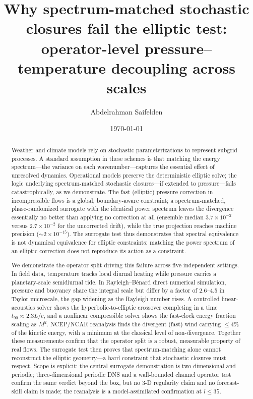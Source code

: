 \documentclass[aps,prfluids,preprint,superscriptaddress,nofootinbib]{revtex4-2}
\begin{document}
\title{Why spectrum-matched stochastic closures fail the elliptic test: operator-level pressure--temperature decoupling across scales}

\author{Abdelrahman Saifelden}

\date{\today}

\begin{abstract}
Weather and climate models rely on stochastic parameterizations to represent subgrid processes. A standard assumption in these schemes is that matching the energy spectrum---the variance on each wavenumber---captures the essential effect of unresolved dynamics. Operational models preserve the deterministic elliptic solve; the logic underlying spectrum-matched stochastic closures---if extended to pressure---fails catastrophically, as we demonstrate. The fast (elliptic) pressure correction in incompressible flows is a global, boundary-aware constraint; a spectrum-matched, phase-randomized surrogate with the identical power spectrum leaves the divergence essentially no better than applying no correction at all (ensemble median $3.7\times10^{-2}$ versus $2.7\times10^{-2}$ for the uncorrected drift), while the true projection reaches machine precision ($\sim2\times10^{-15}$). The surrogate test thus demonstrates that spectral equivalence is not dynamical equivalence for elliptic constraints: matching the power spectrum of an elliptic correction does not reproduce its action as a constraint.

We demonstrate the operator split driving this failure across five independent settings. In field data, temperature tracks local diurnal heating while pressure carries a planetary-scale semidiurnal tide. In Rayleigh--B\'enard direct numerical simulation, pressure and buoyancy share the integral scale but differ by a factor of 2.6--4.5 in Taylor microscale, the gap widening as the Rayleigh number rises. A controlled linear-acoustics solver shows the hyperbolic-to-elliptic crossover completing in a time $t_{90}\approx2.3L/c$, and a nonlinear compressible solver shows the fast-clock energy fraction scaling as $M^{2}$. NCEP/NCAR reanalysis finds the divergent (fast) wind carrying $\leq4\%$ of the kinetic energy, with a minimum at the classical level of non-divergence. Together these measurements confirm that the operator split is a robust, measurable property of real flows. The surrogate test then proves that spectrum-matching alone cannot reconstruct the elliptic geometry---a hard constraint that stochastic closures must respect. Scope is explicit: the central surrogate demonstration is two-dimensional and periodic; three-dimensional periodic DNS and a wall-bounded channel operator test confirm the same verdict beyond the box, but no 3-D regularity claim and no forecast-skill claim is made; the reanalysis is a model-assimilated confirmation at $l \leq 35$.
\end{abstract}
\end{document}
